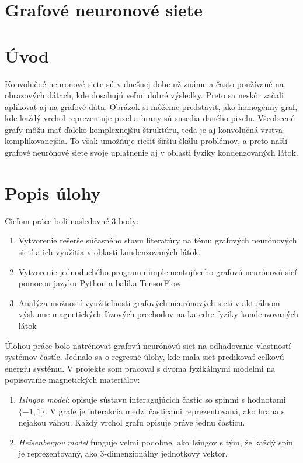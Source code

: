 \documentclass{article}
\begin{document}
\section*{Grafové neuronové siete}

\section*{Úvod}
Konvolučné neuronové siete sú v dnešnej dobe už známe a často používané na obrazových dátach, kde dosahujú veľmi dobré výsledky. Preto sa neskôr začali aplikovať aj na grafové dáta. Obrázok si môžeme predstaviť, ako homogénny graf, kde každý vrchol reprezentuje pixel a hrany sú susedia daného pixelu. Všeobecné grafy môžu mať ďaleko komplexnejšiu štruktúru, teda je aj konvolučná vrstva komplikovanejšia. To však umožňuje riešiť širšiu škálu problémov, a preto našli grafové neurónové siete svoje uplatnenie aj v oblasti fyziky kondenzovaných látok.

\section*{Popis úlohy}
Cieľom práce boli nasledovné 3 body: 
\begin{enumerate}
    \item Vytvorenie rešerše súčasného stavu literatúry na tému grafových neurónových sietí a ich
    využitia v oblasti kondenzovaných látok.
    \item Vytvorenie jednoduchého programu implementujúceho grafovú neurónovú sieť pomocou jazyku
    Python a balíka TensorFlow
    \item Analýza možností využiteľnosti grafových neurónových sietí v aktuálnom výskume magnetických
    fázových prechodov na katedre fyziky kondenzovaných látok
\end{enumerate}

Úlohou práce bolo natrénovať grafovú neurónovú sieť na odhadovanie vlastností systémov častíc. Jednalo sa o regresné úlohy, kde mala sieť predikovať celkovú energiu systému. V projekte som pracoval s dvoma fyzikálnymi modelmi na popisovanie magnetických materiálov:
\begin{enumerate}
    \item \textit{Isingov model}: opisuje sústavu interagujúcich častíc so spinmi s hodnotami $\{-1, 1\}$. V grafe je interakcia medzi časticami reprezentovaná, ako hrana s nejakou váhou. Každý vrchol grafu opisuje práve jednu časticu.
    \item \textit{Heisenbergov model} funguje veľmi podobne, ako Isingov s tým, že každý spin je reprezentovaný, ako 3-dimenzionálny jednotkový vektor.
\end{enumerate}  
\end{document}
